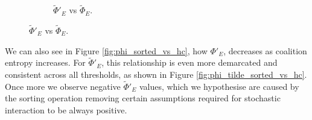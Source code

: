 \documentclass[a4paper,11pt]{article}
\begin{document}
\begin{figure}[H]
\begin{minipage}[b]{0.5\linewidth}
\begin{figure}[H]
\begin{center}
		\caption{
			$\widetilde{\Phi}'_E$ vs $\widetilde{\Phi}_E$.
			\label{fig:phi_tilde_sorted_vs_phi_tilde}
		}
		\end{center}
		\end{figure}
		\vspace{2ex}
	\end{minipage}
\end{figure}


We can also see in Figure \ref{fig:phi_sorted_vs_hc}, how $\Phi'_E$, decreases as coalition entropy increases. For $\widetilde{\Phi}'_E$, this relationship is even more demarcated and consistent across all thresholds, as shown in Figure \ref{fig:phi_tilde_sorted_vs_hc}. Once more we observe negative $\widetilde{\Phi}'_E$ values, which we hypothesise are caused by the sorting operation removing certain assumptions required for stochastic interaction to be always positive.
\end{document}
